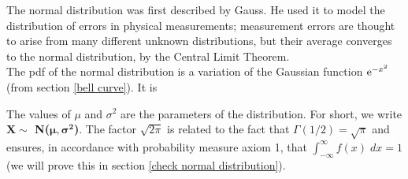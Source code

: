\noindent The normal distribution was first described by Gauss. He used it to model the distribution of errors in physical measurements; measurement errors are thought to arise from many different unknown distributions, but their average converges to the normal distribution, by the Central Limit Theorem. \\

\noindent The pdf of the normal distribution is a variation of the Gaussian function $\mathrm{e}^{-x^2}$ (from section \ref{bell curve}). It is

  	\bigskip
	
	\hfil{}
	\bigskip

\noindent The values of $\mu$ and $\sigma^2$ are the parameters of the distribution. For short, we write \textbf{$\boldsymbol{X \sim}$ N($\boldsymbol{\mu,\sigma^2}$)}. The factor $\sqrt{2\pi}$ is related to the fact that $\Gamma(1/2) = \sqrt{\pi}$ and ensures, in accordance with probability measure axiom 1, that $\int_{-\infty}^\infty f(x) \; dx = 1$ (we will prove this in section \ref{check normal distribution}). \\

